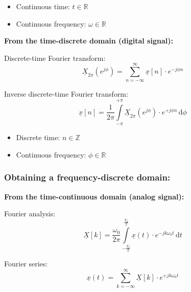 \begin{refsection}
\begin{minipage}{0.45\linewidth}
	\begin{itemize}
		\item Continuous time: $t \in \mathbb{R}$
		\item Continuous frequency: $\omega \in \mathbb{R}$
	\end{itemize}
\end{minipage}
\hfill
\begin{minipage}{0.45\linewidth}
	\textbf{From the time-discrete domain (digital signal):}
	
	\vspace{0.5em}
	
	Discrete-time Fourier transform:
	\begin{equation*}
		\underline{X}_{2\pi}(e^{j \phi}) = \sum\limits_{n = -\infty}^{\infty} \underline{x}[n] \cdot e^{- j \phi n}
	\end{equation*}
	
	Inverse discrete-time Fourier transform:
	\begin{equation*}
		\underline{x}[n] = \frac{1}{2 \pi} \int\limits_{- \pi}^{+ \pi} \underline{X}_{2\pi}(e^{j \phi}) \cdot e^{+ j \phi n} \, \mathrm{d} \phi
	\end{equation*}
	
	\begin{itemize}
		\item Discrete time: $n \in \mathbb{Z}$
		\item Continuous frequency: $\phi \in \mathbb{R}$
	\end{itemize}
\end{minipage}

\subsubsection{Obtaining a frequency-discrete domain:}

\begin{minipage}{0.45\linewidth}
	\textbf{From the time-continuous domain (analog signal):}
	
	\vspace{0.5em}
	
	Fourier analysis:
	\begin{equation*}
		\underline{X}[k] = \frac{\omega_0}{2 \pi} \int\limits_{-\frac{T_0}{2}}^{\frac{T_0}{2}} \underline{x}(t) \cdot e^{-j k \omega_0 t} \, \mathrm{d} t
	\end{equation*}
	
	Fourier series:
	\begin{equation*}
		\underline{x}(t) = \sum\limits_{k = -\infty}^{\infty} \underline{X}[k] \cdot e^{+ j k \omega_0 t}
	\end{equation*}
	

\end{minipage}
\end{refsection}
